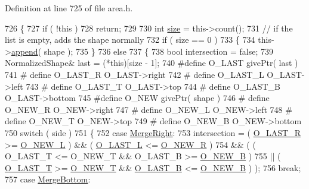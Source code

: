 Definition at line 725 of file area.\+h.


\begin{DoxyCode}
726 \{
727     \textcolor{keywordflow}{if} ( !\textcolor{keyword}{this} )
728         \textcolor{keywordflow}{return};
729 
730     \textcolor{keywordtype}{int} \hyperlink{synctex__parser_8c_aa23c661441688350614bd6a350d2b6ff}{size} = this->count();
731     \textcolor{comment}{// if the list is empty, adds the shape normally}
732     \textcolor{keywordflow}{if} ( size == 0 )
733     \{
734         this->\hyperlink{generator__pdf_8cpp_af89a069d971b564171ae5c9bc238c420}{append}( shape );
735     \}
736     \textcolor{keywordflow}{else}
737     \{
738         \textcolor{keywordtype}{bool} intersection = \textcolor{keyword}{false};
739         NormalizedShape& last = (*this)[size - 1];
740 \textcolor{preprocessor}{#define O\_LAST givePtr( last )}
741 \textcolor{preprocessor}{#  define O\_LAST\_R O\_LAST->right}
742 \textcolor{preprocessor}{#  define O\_LAST\_L O\_LAST->left}
743 \textcolor{preprocessor}{#  define O\_LAST\_T O\_LAST->top}
744 \textcolor{preprocessor}{#  define O\_LAST\_B O\_LAST->bottom}
745 \textcolor{preprocessor}{#define O\_NEW givePtr( shape )}
746 \textcolor{preprocessor}{#  define O\_NEW\_R O\_NEW->right}
747 \textcolor{preprocessor}{#  define O\_NEW\_L O\_NEW->left}
748 \textcolor{preprocessor}{#  define O\_NEW\_T O\_NEW->top}
749 \textcolor{preprocessor}{#  define O\_NEW\_B O\_NEW->bottom}
750         \textcolor{keywordflow}{switch} ( side )
751         \{
752             \textcolor{keywordflow}{case} \hyperlink{namespaceOkular_ad98deec425adfb02ba05a78568bccceba809db1d0fade6720582a2c4f35299e5a}{MergeRight}:
753                 intersection = ( \hyperlink{area_8h_ad0961130bf7b05cc0225946ccdec8536}{O\_LAST\_R} >= \hyperlink{area_8h_a8a12d1980d75a4918cb7473c87253b3d}{O\_NEW\_L} ) && ( 
      \hyperlink{area_8h_a19d8ec29fbb2b8db2051d5b6ae7bed55}{O\_LAST\_L} <= \hyperlink{area_8h_a2102e0d0f3fd7e0313c5e99cc1a40522}{O\_NEW\_R} )
754                                && ( ( O\_LAST\_T <= O\_NEW\_T && O\_LAST\_B >= \hyperlink{area_8h_a4e865e98f50bf8070b1c2bfa6dd1eb3f}{O\_NEW\_B} )
755                                   || ( \hyperlink{area_8h_acf8cff7a963f611164914655a5fad217}{O\_LAST\_T} >= \hyperlink{area_8h_a88003092895c0a5496264ade43c4ae60}{O\_NEW\_T} && 
      \hyperlink{area_8h_acb5c5436194a8d4ad5b3c76166d25820}{O\_LAST\_B} <= \hyperlink{area_8h_a4e865e98f50bf8070b1c2bfa6dd1eb3f}{O\_NEW\_B} ) );
756                 \textcolor{keywordflow}{break};
757             \textcolor{keywordflow}{case} \hyperlink{namespaceOkular_ad98deec425adfb02ba05a78568bccceba3b750f74fdec8486675e9ef46dfe7626}{MergeBottom}:

\end{DoxyCode}
